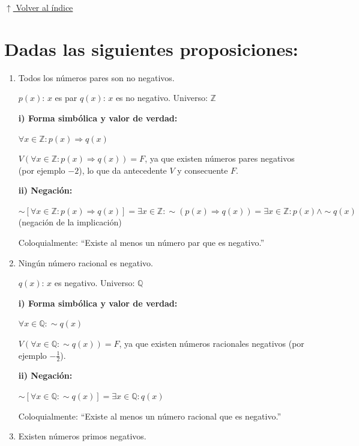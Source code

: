 \documentclass[12pt]{article}
\newcommand{\volverindice}{%
    \vspace{1em}%
    \begin{flushright}%
        \hyperlink{indice}{\small $\uparrow$ Volver al índice}%
    \end{flushright}%
}
\begin{document}
\volverindice
\newpage


\section[Traducción simbólica y negación]{Dadas las siguientes proposiciones:}

\begin{enumerate}[label=\alph*.-]
    \item Todos los números pares son no negativos.

    $p(x)$: $x$ es par \quad $q(x)$: $x$ es no negativo. \quad Universo: $\mathbb{Z}$

    \textbf{i) Forma simbólica y valor de verdad:}

    $\forall x \in \mathbb{Z}: p(x) \Rightarrow q(x)$

    $V(\forall x \in \mathbb{Z}: p(x) \Rightarrow q(x)) = F$, ya que existen números pares negativos (por ejemplo $-2$), lo que da antecedente $V$ y consecuente $F$.

    \textbf{ii) Negación:}

    $\sim\left[\forall x \in \mathbb{Z}: p(x) \Rightarrow q(x)\right] = \exists x \in \mathbb{Z}: \sim(p(x) \Rightarrow q(x)) = \exists x \in \mathbb{Z}: p(x) \wedge \sim q(x)$ \quad (negación de la implicación)

    Coloquialmente: ``Existe al menos un número par que es negativo.''

    \item Ningún número racional es negativo.

    $q(x)$: $x$ es negativo. \quad Universo: $\mathbb{Q}$

    \textbf{i) Forma simbólica y valor de verdad:}

    $\forall x \in \mathbb{Q}: \sim q(x)$

    $V(\forall x \in \mathbb{Q}: \sim q(x)) = F$, ya que existen números racionales negativos (por ejemplo $-\frac{1}{2}$).

    \textbf{ii) Negación:}

    $\sim\left[\forall x \in \mathbb{Q}: \sim q(x)\right] = \exists x \in \mathbb{Q}: q(x)$

    Coloquialmente: ``Existe al menos un número racional que es negativo.''

    \item Existen números primos negativos.


\end{enumerate}
\end{document}
